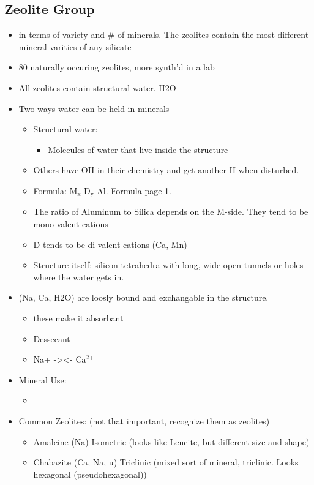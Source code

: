 \documentclass[11pt]{article}
\begin{document}
\subsection{Zeolite Group}
\label{sec-2-1}
\begin{itemize}
\item in terms of variety and \# of minerals. The zeolites contain the most different mineral varities of any silicate
\item 80 naturally occuring zeolites, more synth'd in a lab
\item All zeolites contain structural water. H2O
\item Two ways water can be held in minerals
\begin{itemize}
\item Structural water:
\begin{itemize}
\item Molecules of water that live inside the structure
\end{itemize}
\item Others have OH in their chemistry and get another H when disturbed.
\item Formula: M$_{\text{x}}$ D$_{\text{y}}$ Al. Formula page 1.
\item The ratio of Aluminum to Silica depends on the M-side. They tend to be mono-valent cations
\item D tends to be di-valent cations (Ca, Mn)
\item Structure itself: silicon tetrahedra with long, wide-open tunnels or holes where the water gets in.
\end{itemize}
\item (Na, Ca, H2O) are loosly bound and exchangable in the structure.
\begin{itemize}
\item these make it absorbant
\item Dessecant
\item Na+ -><- Ca$^{\text{2+}}$
\end{itemize}
\item Mineral Use:
\begin{itemize}
\item 
\end{itemize}
\item Common Zeolites: (not that important, recognize them as zeolites)
\begin{itemize}
\item Amalcine (Na) Isometric (looks like Leucite, but different size and shape)
\item Chabazite (Ca, Na, u) Triclinic (mixed sort of mineral, triclinic. Looks hexagonal (pseudohexagonal))

\end{itemize}
\end{itemize}
\end{document}
